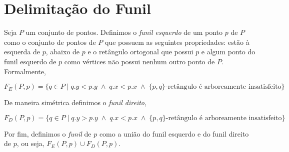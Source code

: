 \section{Delimitação do Funil}

Seja $P$ um conjunto de pontos. Definimos o \textit{funil esquerdo} de um ponto $p$ de $P$ como o conjunto de pontos de $P$ que possuem as seguintes propriedades: estão à esquerda de $p$, abaixo de $p$ e o retângulo ortogonal que possui $p$ e algum ponto do funil esquerdo de $p$ como vértices não possui nenhum outro ponto de $P$. Formalmente, 

$F_E(P,p) = \{q \in P \mid q.y < p.y \; \land \; q.x < p.x \; \land \; \{p,q\}\text{-retângulo é arboreamente insatisfeito}\}$

De maneira simétrica definimos o \textit{funil direito},

$F_D(P,p) = \{q \in P \mid q.y > p.y \; \land \; q.x < p.x \; \land \; \{p,q\}\text{-retângulo é arboreamente insatisfeito}\}$

Por fim, definimos o \textit{funil} de $p$ como a união do funil esquerdo e do funil direito de $p$, ou seja, $F_E(P,p) \cup F_D(P,p)$.

\begin{comment}
    \begin{tikzpicture}[scale=1]
        \draw[very thin, gray!70] (0,0) grid (12,12);
        
        \draw[fill=gray, gray] (0,0) rectangle (1,10);
        \draw[fill=gray, gray] (1,0) rectangle (2,9);
        \draw[fill=gray, gray] (2,0) rectangle (4,5);
        \draw[fill=gray, gray] (4,0) rectangle (5,1);
        \draw[fill=gray, gray] (11,8) rectangle (12,0);
        \draw[fill=gray, gray] (10,7) rectangle (11,0);
        \draw[fill=gray, gray] (8,6) rectangle (10,0);
        \draw[fill=gray, gray] (7,2) rectangle (8,0);

        \filldraw[black] (5,1) circle (7pt);
        \filldraw[black] (7,2) circle (7pt);
        \filldraw[black] (3,3) circle (7pt);
        \filldraw[black] (9,4) circle (7pt);
        \filldraw[black] (4,5) circle (7pt);
        \filldraw[black] (8,6) circle (7pt);
        \filldraw[black] (10,7) circle (7pt);
        \filldraw[black] (11,8) circle (7pt);
        \filldraw[black] (2,9) circle (7pt);
        \filldraw[black] (1,10) circle (7pt);
        \filldraw[black] (6,11) circle (7pt);
        \node at (1.4,10.5) {\textbf{\Large E}};
        \node at (2.4,9.5) {\textbf{\Large E}};
        \node at (4.4,5.5) {\textbf{\Large E}};
        \node at (5.4,1.5) {\textbf{\Large E}};
        \node at (10.6,8.5) {\textbf{\Large D}};
        \node at (9.6,7.5) {\textbf{\Large D}};
        \node at (7.6,6.5) {\textbf{\Large D}};
        \node at (6.6,2.5) {\textbf{\Large D}};
        \draw[black, line width=0.5pt] (0,0) rectangle (12,12);
    \end{tikzpicture}
\end{comment}

